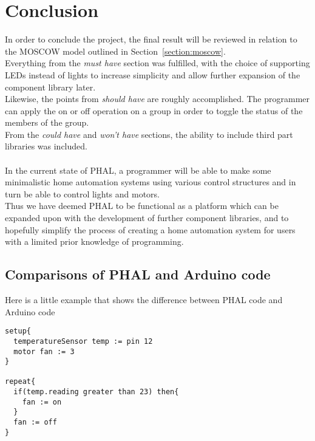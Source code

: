 \chapter{Conclusion}\label{ch:conclusion}
In order to conclude the project, the final result will be reviewed in relation to the MOSCOW model outlined in Section~\ref{section:moscow}.
\\
Everything from the \textit{must have} section was fulfilled, with the choice of supporting LEDs instead of lights to increase simplicity and allow further expansion of the component library later.
\\
Likewise, the points from \textit{should have} are roughly accomplished. 
The programmer can apply the on or off operation on a group in order to toggle the status of the members of the group.
\\
From the \textit{could have} and \textit{won't have} sections, the ability to include third part libraries was included.
\\\\
In the current state of PHAL, a programmer will be able to make some minimalistic home automation systems using various control structures and in turn be able to control lights and motors.
\\ 
Thus we have deemed PHAL to be functional as a platform which can be expanded upon with the development of further component libraries, and to hopefully simplify the process of creating a home automation system for users with a limited prior knowledge of programming.
\\
\section{Comparisons of PHAL and Arduino code}
Here is a little example that shows the difference between PHAL code and Arduino code

\begin{lstlisting}[caption={Code example in Phal}, label={code:codePhal}]
setup{
  temperatureSensor temp := pin 12
  motor fan := 3
}

repeat{
  if(temp.reading greater than 23) then{
    fan := on
  }
  fan := off
}
\end{lstlisting}


